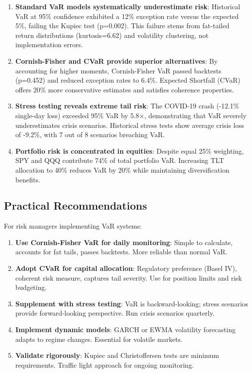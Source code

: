\documentclass[12pt,a4paper]{article}
\begin{document}
\begin{enumerate}
    \item \textbf{Standard VaR models systematically underestimate risk}: Historical VaR at 95\% confidence exhibited a 12\% exception rate versus the expected 5\%, failing the Kupiec test (p=0.002). This failure stems from fat-tailed return distributions (kurtosis=6.62) and volatility clustering, not implementation errors.

    \item \textbf{Cornish-Fisher and CVaR provide superior alternatives}: By accounting for higher moments, Cornish-Fisher VaR passed backtests (p=0.452) and reduced exception rates to 6.4\%. Expected Shortfall (CVaR) offers 20\% more conservative estimates and satisfies coherence properties.

    \item \textbf{Stress testing reveals extreme tail risk}: The COVID-19 crash (-12.1\% single-day loss) exceeded 95\% VaR by 5.8×, demonstrating that VaR severely underestimates crisis scenarios. Historical stress tests show average crisis loss of -9.2\%, with 7 out of 8 scenarios breaching VaR.

    \item \textbf{Portfolio risk is concentrated in equities}: Despite equal 25\% weighting, SPY and QQQ contribute 74\% of total portfolio VaR. Increasing TLT allocation to 40\% reduces VaR by 20\% while maintaining diversification benefits.
\end{enumerate}

\subsection{Practical Recommendations}

For risk managers implementing VaR systems:

\begin{enumerate}
    \item \textbf{Use Cornish-Fisher VaR for daily monitoring}: Simple to calculate, accounts for fat tails, passes backtests. More reliable than normal VaR.

    \item \textbf{Adopt CVaR for capital allocation}: Regulatory preference (Basel IV), coherent risk measure, captures tail severity. Use for position limits and risk budgeting.

    \item \textbf{Supplement with stress testing}: VaR is backward-looking; stress scenarios provide forward-looking perspective. Run crisis scenarios quarterly.

    \item \textbf{Implement dynamic models}: GARCH or EWMA volatility forecasting adapts to regime changes. Essential for volatile markets.

    \item \textbf{Validate rigorously}: Kupiec and Christoffersen tests are minimum requirements. Traffic light approach for ongoing monitoring.
\end{enumerate}
\end{document}
